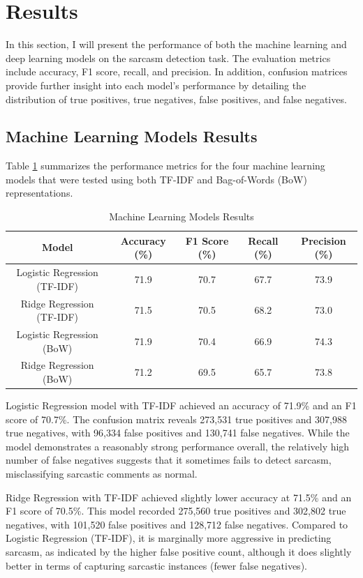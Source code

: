 \section{Results}
In this section, I will present the performance of both the machine learning and deep learning models on the sarcasm detection task. The evaluation metrics include accuracy, F1 score, 
recall, and precision. In addition, confusion matrices provide further insight into each model's performance by detailing the distribution of true positives, true negatives, 
false positives, and false negatives.

\subsection{Machine Learning Models Results}

Table \ref{Table_1} summarizes the performance metrics for the four machine learning models that were tested using both TF-IDF and Bag-of-Words (BoW) representations.

\begin{table}
    \caption{Machine Learning Models Results}
    \label{Table_1}
    \begin{tabular}{ccccc}
        \toprule
            \textbf{Model} & \textbf{Accuracy (\%)} & \textbf{F1 Score (\%)} & \textbf{Recall (\%)} & \textbf{Precision (\%)} \\
        \midrule
            Logistic Regression (TF-IDF)  & 71.9 & 70.7 & 67.7 & 73.9 \\
            Ridge Regression (TF-IDF)     & 71.5 & 70.5 & 68.2 & 73.0 \\
            Logistic Regression (BoW)     & 71.9 & 70.4 & 66.9 & 74.3 \\
            Ridge Regression (BoW)        & 71.2 & 69.5 & 65.7 & 73.8 \\
         \bottomrule
    \end{tabular}
\end{table}

Logistic Regression model with TF-IDF achieved an accuracy of 71.9\% and an F1 score of 70.7\%. The confusion matrix reveals 273,531 true positives and 307,988 true negatives, 
with 96,334 false positives and 130,741 false negatives. While the model demonstrates a reasonably strong performance overall, the relatively high number of false negatives suggests that it sometimes 
fails to detect sarcasm, misclassifying sarcastic comments as normal.

Ridge Regression with TF-IDF achieved slightly lower accuracy at 71.5\% and an F1 score of 70.5\%. This model recorded 275,560 true positives and 302,802 true negatives, 
with 101,520 false positives and 128,712 false negatives. Compared to Logistic Regression (TF-IDF), it is marginally more aggressive in predicting sarcasm, as indicated by the higher 
false positive count, although it does slightly better in terms of capturing sarcastic instances (fewer false negatives).

